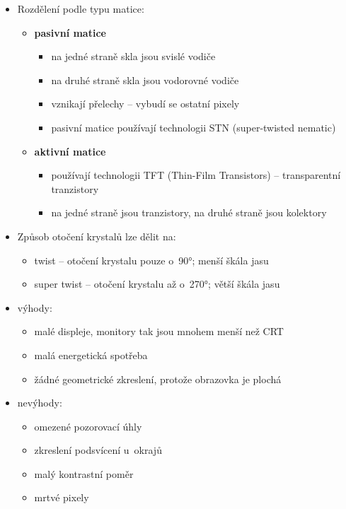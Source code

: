 \documentclass[a4paper,12pt]{article}
\providecommand{\tightlist}{%
\setlength{\itemsep}{0pt}\setlength{\parskip}{0pt}}
\begin{document}
\begin{itemize}
  \item Rozdělení podle typu matice:
  \begin{itemize}
    \tightlist
    \item \textbf{pasivní matice}
    \begin{itemize}
      \tightlist
      \item na jedné straně skla jsou svislé vodiče
      \item na druhé straně skla jsou vodorovné vodiče
      \item vznikají přelechy -- vybudí se ostatní pixely
      \item pasivní matice používají technologii STN (super-twisted nematic)
    \end{itemize}
    \item \textbf{aktivní matice}
    \begin{itemize}
      \tightlist
      \item používají technologii TFT (Thin-Film Transistors) -- transparentní tranzistory
      \item na jedné straně jsou tranzistory, na druhé straně jsou kolektory
    \end{itemize}
  \end{itemize}

  \item Způsob otočení krystalů lze dělit na:
  \begin{itemize}
    \tightlist
    \item twist -- otočení krystalu pouze o~90°; menší škála jasu
    \item super twist -- otočení krystalu až o~270°; větší škála jasu
  \end{itemize}

  \item výhody:
  \begin{itemize}
    \tightlist
    \item malé displeje, monitory tak jsou mnohem menší než CRT
    \item malá energetická spotřeba
    \item žádné geometrické zkreslení, protože obrazovka je plochá
  \end{itemize}

  \item nevýhody:
  \begin{itemize}
    \tightlist
    \item omezené pozorovací úhly
    \item zkreslení podsvícení u~okrajů
    \item malý kontrastní poměr
    \item mrtvé pixely
  \end{itemize}

\end{itemize}
\end{document}

